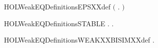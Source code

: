 \newcommand{\HOLWeakEQDate}{11 Settembre 2019}
\newcommand{\HOLWeakEQTime}{02:17}
\begin{SaveVerbatim}{HOLWeakEQDefinitionsEPSXXdef}
\HOLTokenTurnstile{}  \HOLSymConst{\ensuremath{=}} \ensuremath{(}\HOLTokenLambda{} .  \HOLTokenTransBegin\HOLConst{\ensuremath{\tau}}\HOLTokenTransEnd {}\ensuremath{)}\HOLSymConst{\HOLTokenSupStar{}}
\end{SaveVerbatim}
\newcommand{\HOLWeakEQDefinitionsEPSXXdef}{\UseVerbatim{HOLWeakEQDefinitionsEPSXXdef}}
\begin{SaveVerbatim}{HOLWeakEQDefinitionsSTABLE}
\HOLTokenTurnstile{} \HOLSymConst{\HOLTokenForall{}}.   \HOLSymConst{\HOLTokenEquiv{}} \HOLSymConst{\HOLTokenForall{}} .  \HOLTokenTransBegin{}\HOLTokenTransEnd {} \HOLSymConst{\HOLTokenImp{}}  \HOLSymConst{\HOLTokenNotEqual{}} \HOLConst{\ensuremath{\tau}}
\end{SaveVerbatim}
\newcommand{\HOLWeakEQDefinitionsSTABLE}{\UseVerbatim{HOLWeakEQDefinitionsSTABLE}}
\begin{SaveVerbatim}{HOLWeakEQDefinitionsWEAKXXBISIMXXdef}
\HOLTokenTurnstile{} \HOLSymConst{\HOLTokenForall{}}.   \HOLSymConst{\HOLTokenEquiv{}}   \HOLConst{\ensuremath{\tau}} 
\end{SaveVerbatim}
\newcommand{\HOLWeakEQDefinitionsWEAKXXBISIMXXdef}{\UseVerbatim{HOLWeakEQDefinitionsWEAKXXBISIMXXdef}}
